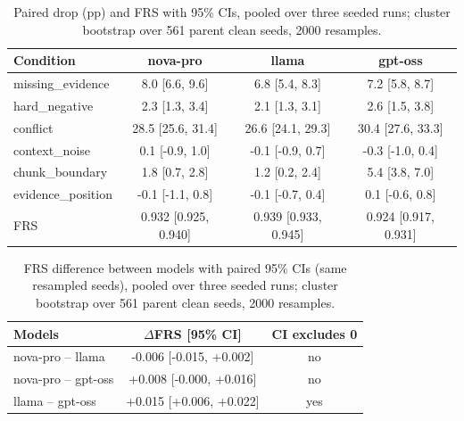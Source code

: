 \begin{table}[t]
\centering\small
\caption{Paired drop (pp) and FRS with 95\% CIs, pooled over three seeded runs; cluster bootstrap over 561 parent clean seeds, 2000 resamples.}
\begin{tabular}{lccc}
\toprule
Condition & nova-pro & llama & gpt-oss \\
\midrule
missing\_evidence & 8.0 [6.6, 9.6] & 6.8 [5.4, 8.3] & 7.2 [5.8, 8.7] \\
hard\_negative & 2.3 [1.3, 3.4] & 2.1 [1.3, 3.1] & 2.6 [1.5, 3.8] \\
conflict & 28.5 [25.6, 31.4] & 26.6 [24.1, 29.3] & 30.4 [27.6, 33.3] \\
context\_noise & 0.1 [-0.9, 1.0] & -0.1 [-0.9, 0.7] & -0.3 [-1.0, 0.4] \\
chunk\_boundary & 1.8 [0.7, 2.8] & 1.2 [0.2, 2.4] & 5.4 [3.8, 7.0] \\
evidence\_position & -0.1 [-1.1, 0.8] & -0.1 [-0.7, 0.4] & 0.1 [-0.6, 0.8] \\
FRS & 0.932 [0.925, 0.940] & 0.939 [0.933, 0.945] & 0.924 [0.917, 0.931] \\
\bottomrule
\end{tabular}
\end{table}

\begin{table}[t]
\centering\small
\caption{FRS difference between models with paired 95\% CIs (same resampled seeds), pooled over three seeded runs; cluster bootstrap over 561 parent clean seeds, 2000 resamples.}
\begin{tabular}{lcc}
\toprule
Models & $\Delta$FRS [95\% CI] & CI excludes 0 \\
\midrule
nova-pro -- llama & -0.006 [-0.015, +0.002] & no \\
nova-pro -- gpt-oss & +0.008 [-0.000, +0.016] & no \\
llama -- gpt-oss & +0.015 [+0.006, +0.022] & yes \\
\bottomrule
\end{tabular}
\end{table}

